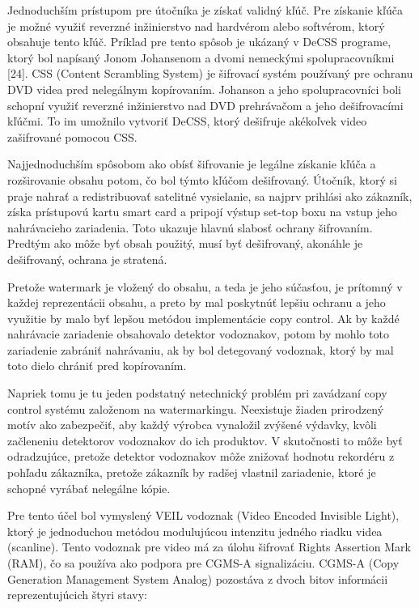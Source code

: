 Jednoduchším prístupom pre útočníka je získať validný kľúč. Pre získanie kľúča je možné využiť reverzné inžinierstvo nad hardvérom alebo softvérom, ktorý obsahuje tento kľúč. Príklad pre tento spôsob je ukázaný v DeCSS programe, ktorý bol napísaný Jonom Johansenom a dvomi nemeckými spolupracovníkmi [24]. %
CSS (Content Scrambling System) je šifrovací systém používaný pre ochranu DVD videa pred nelegálnym kopírovaním. Johanson a jeho spolupracovníci boli schopní využiť reverzné inžinierstvo nad DVD prehrávačom a jeho dešifrovacími kľúčmi. To im umožnilo vytvoriť DeCSS, ktorý dešifruje akékoľvek video zašifrované pomocou CSS.

Najjednoduchším spôsobom ako obísť šifrovanie je legálne získanie kľúča a rozširovanie obsahu potom, čo bol týmto kľúčom dešifrovaný. Útočník, ktorý si praje nahrať a redistribuovať satelitné vysielanie, sa najprv prihlási ako zákazník, získa prístupovú kartu smart card a pripojí výstup set-top boxu na vstup jeho nahrávacieho zariadenia. Toto ukazuje hlavnú slabosť ochrany šifrovaním. Predtým ako môže byť obsah použitý, musí byť dešifrovaný, akonáhle je dešifrovaný, ochrana je stratená.

Pretože watermark je vložený do obsahu, a teda je jeho súčasťou, je prítomný v každej reprezentácii obsahu, a preto by mal poskytnúť lepšiu ochranu a jeho využitie by malo byť lepšou metódou implementácie copy control. Ak by každé nahrávacie zariadenie obsahovalo detektor vodoznakov, potom by mohlo toto zariadenie zabrániť nahrávaniu, ak by bol detegovaný vodoznak, ktorý by mal toto dielo chrániť pred kopírovaním.

Napriek tomu je tu jeden podstatný netechnický problém pri zavádzaní copy control systému založenom na watermarkingu. Neexistuje žiaden prirodzený motív ako zabezpečiť, aby každý výrobca vynaložil zvýšené výdavky, kvôli začleneniu detektorov vodoznakov do ich produktov. V skutočnosti to môže byť odradzujúce, pretože detektor vodoznakov môže znižovať hodnotu rekordéru z pohľadu zákazníka, pretože zákazník by radšej vlastnil zariadenie, ktoré je schopné vyrábať nelegálne kópie.

Pre tento účel bol vymyslený VEIL vodoznak (Video Encoded Invisible Light), ktorý je jednoduchou metódou modulujúcou intenzitu jedného riadku videa (scanline). Tento vodoznak pre video má za úlohu šifrovať Rights Assertion Mark (RAM), čo sa používa ako podpora pre CGMS-A signalizáciu. CGMS-A (Copy Generation Management System Analog) pozostáva z dvoch bitov informácii reprezentujúcich štyri stavy:


